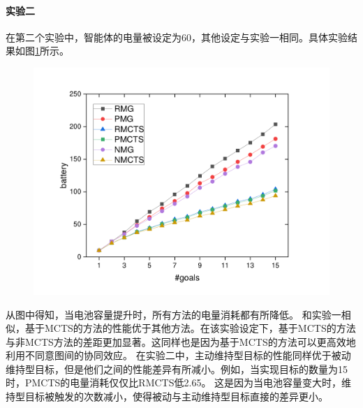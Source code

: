 \paragraph{实验二}
在第二个实验中，智能体的电量被设定为60，其他设定与实验一相同。具体实验结果如图\ref{fig:static2}所示。
\begin{figure}[h!]
\centering
\includegraphics[scale=0.4]{./figs/gX_cY_fixCap60.pdf}
\captionsetup{justification=centering}
\label{fig:static2}
\end{figure}

从图中得知，当电池容量提升时，所有方法的电量消耗都有所降低。
%
和实验一相似，基于MCTS的方法的性能优于其他方法。在该实验设定下，基于MCTS的方法与非MCTS方法的差距更加显著。这同样也是因为基于MCTS的方法可以更高效地利用不同意图间的协同效应。
%
在实验二中，主动维持型目标的性能同样优于被动维持型目标，但是他们之间的性能差异有所减小。例如，当实现目标的数量为15时，PMCTS的电量消耗仅仅比RMCTS低2.65。
%
这是因为当电池容量变大时，维持型目标被触发的次数减小，使得被动与主动维持型目标直接的差异更小。

